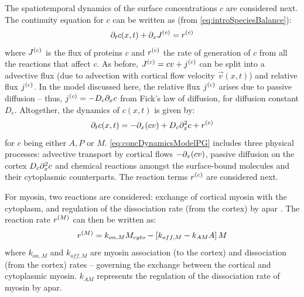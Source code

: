 The spatiotemporal dynamics of the surface concentrations $c$ are considered next. The continuity equation for $c$ can be written as (from \autoref{eq:introSpeciesBalance}):
\begin{equation}
    \inlinePartial{t}{c}(x,t) + \inlinePartial{x}{\speciesSuper{J}{c}} = \speciesSuper{r}{c}
\end{equation}
where $J^{(c)}$ is the flux of proteins $c$ and $r^{(c)}$ the rate of generation of $c$ from all the reactions that affect $c$. As before, $J^{(c)} = cv + j^{(c)}$ can be split into a advective flux (due to advection with cortical flow velocity $\vec{v}(x,t)$) and relative flux $j^{(c)}$. In the model discussed here, the relative flux $j^{(c)}$ arises due to passive diffusion -- thus, $\speciesSuper{j}{c} = -D_c\inlinePartial{x}{c}$ from Fick's law of diffusion, for diffusion constant $D_c$. Altogether, the dynamics of $c(x,t)$ is given by:
\begin{equation}\label{eq:concDynamicsModelPG}
    \inlinePartial{t}{c}(x,t) = -\inlinePartial{x}{(cv)} + D_c\inlinePartial[2]{x}{c} + \speciesSuper{r}{c} 
\end{equation}
for $c$ being either $A,P$ or $M$. \autoref{eq:concDynamicsModelPG} includes three physical processes: advective transport by cortical flows $-\inlinePartial{x}{(cv)}$, passive diffusion on the cortex $D_c\inlinePartial[2]{x}{c}$ and chemical reactions amongst the surface-bound molecules and their cytoplasmic counterparts. The reaction terms $r^{(c)}$ are considered next.

For myosin, two reactions are considered: exchange of cortical myosin with the cytoplasm, and regulation of the dissociation rate (from the cortex) by \ac{apar} \citep{gross2019guiding}. The reaction rate $r^{(M)}$ can then be written as:
\begin{equation}\label{eq:myosinChemicalRateModelPG}
    r^{(M)} = k_{on,M}M_{cyto} - \left[k_{off,M} - k_{AM}A\right]M
\end{equation}
where $k_{on,M}$ and $k_{off,M}$ are myosin association (to the cortex) and dissociation (from the cortex) rates -- governing the exchange between the cortical and cytoplasmic myosin. $k_{AM}$ represents the regulation of the dissociation rate of myosin by \ac{apar}.

